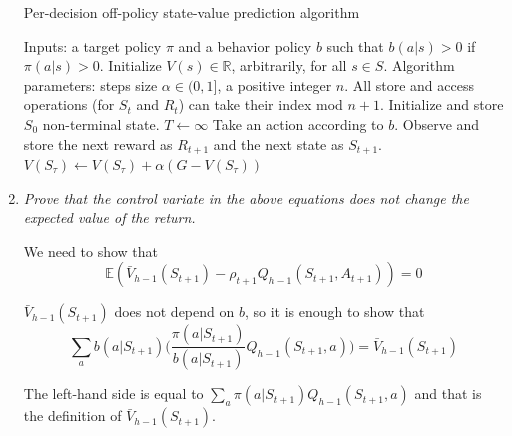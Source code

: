 \documentclass[12pt,a4paper]{article}
\begin{document}
\begin{enumerate}
    \begin{algorithm}
      \caption{Per-decision off-policy state-value prediction algorithm}
      \begin{algorithmic}
        \STATE Inputs: a target policy $\pi$ and a behavior policy $b$ such that
        \STATE $b(a|s) > 0$ if $\pi(a|s) > 0$.
        \STATE Initialize $V(s) \in \mathbb{R}$, arbitrarily, for all $s \in S$.
        \STATE Algorithm parameters: steps size $\alpha \in (0, 1]$, a positive
        integer $n$.
        \STATE All store and access operations (for $S_t$ and $R_t$) can take their index mod $n + 1$.
          \STATE Initialize and store $S_0$ non-terminal state.
          \STATE $T \leftarrow \infty$
              \STATE Take an action according to $b$.
              \STATE Observe and store the next reward as $R_{t + 1}$ and the
              next state as $S_{t + 1}$.
              \ENDIF
            \ENDIF
              \ENDFOR
              \ENDIF
              \STATE $V(S_\tau) \leftarrow V(S_\tau) + \alpha(G - V(S_\tau))$
            \ENDIF
            \ENDIF
            \ENDFOR
        \ENDFOR
      \end{algorithmic}
    \end{algorithm}

  \item
    \textit{Prove that the control variate in the above equations does not change the
    expected value of the return.}

    We need to show that
    \[
    \mathbb{E} (\bar{V}_{h - 1}(S_{t + 1}) - \rho_{t + 1} Q_{h - 1}
    (S_{t + 1}, A_{t + 1})) = 0
    \]

    $\bar{V}_{h - 1}(S_{t + 1})$ does not depend on $b$, so it is enough to show
    that
    \[\sum\limits_a b(a|S_{t + 1}) \Big(\frac{\pi(a | S_{t + 1})}{b(a | S_{t + 1})} Q_{h - 1}(S_{t + 1}, a)\Big) = \bar{V}_{h - 1}(S_{t + 1})
    \]

    The left-hand side is equal to $\sum\limits_a \pi(a | S_{t + 1})Q_{h - 1}(S_{t + 1}, a)$ and that is the definition of $\bar{V}_{h - 1}(S_{t + 1})$.


\end{enumerate}
\end{document}
